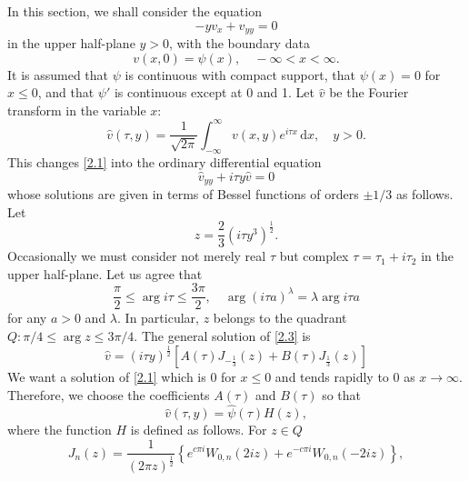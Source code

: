 \documentclass[leqno]{article}
\numberwithin{equation}{section}
\theoremstyle{plain}
\newcommand{\dd}{\,\mathrm{d}}
\begin{document}
In this section, we shall consider the equation
\begin{equation} \label{2.1}
	-y v_{x}+v_{y y}=0
\end{equation}
in the upper half-plane $y>0$, with the boundary data
\begin{equation} \label{2.2}
	v(x, 0) = \psi(x), \quad-\infty<x<\infty.
\end{equation}
It is assumed that $\psi$ is continuous with compact support, that $\psi(x)=0$ for $x \leq 0$, and that $\psi'$ is continuous except at 0 and 1.
Let $\hat{v}$ be the Fourier transform in the variable $x$:
\begin{equation*}
	\hat{v}(\tau, y)=\frac{1}{\sqrt{2 \pi}} \int_{-\infty}^{\infty} v(x, y) e^{i \tau x} \dd x, \quad y>0.
\end{equation*}
This changes \eqref{2.1} into the ordinary differential equation
\begin{equation} \label{2.3}
	\hat{v}_{y y}+i\tau y \hat{v}=0
\end{equation}
whose solutions are given in terms of Bessel functions of orders $\pm 1 / 3$ as follows. Let
\begin{equation*}
	z=\frac{2}{3}\left(i \tau y^{3}\right)^{\frac{1}{2}}.
\end{equation*}
Occasionally we must consider not merely real $\tau$ but complex $\tau = \tau_1 + i\tau_2$ in the upper half-plane.
Let us agree that
\begin{equation*}
	\frac \pi 2 \leq \arg i \tau \leq \frac{3\pi}{2},
	\quad 
	\arg (i\tau a)^\lambda = \lambda \arg i \tau a
\end{equation*}
for any $a > 0$ and $\lambda$.
In particular, $z$ belongs to the quadrant $Q: \pi/4 \leq \arg z \leq 3 \pi / 4$.
The general solution of \eqref{2.3} is
\begin{equation*}
	\hat{v} = (i \tau y)^{\frac 12} \left[ A(\tau) J_{-\frac 13}(z) + B(\tau) J_{\frac 13}(z) \right]
\end{equation*}
We want a solution of \eqref{2.1} which is $0$ for $x \leq 0$ and tends rapidly to $0$ as $x \to \infty$.
Therefore, we choose the coefficients $A(\tau)$ and $B(\tau)$ so that
\begin{equation}
	\label{2.4}
	\hat{v}(\tau,y) = \hat{\psi}(\tau) H(z),
\end{equation}
where the function $H$ is defined as follows.
For $z \in Q$
\begin{equation*}
	J_n(z) = \frac{1}{(2\pi z)^{\frac 12}} \left\{
	e^{c\pi i} W_{0,n}(2iz)
	+ e^{-c\pi i} W_{0,n}(-2iz)
	\right\},
\end{equation*}
\end{document}
